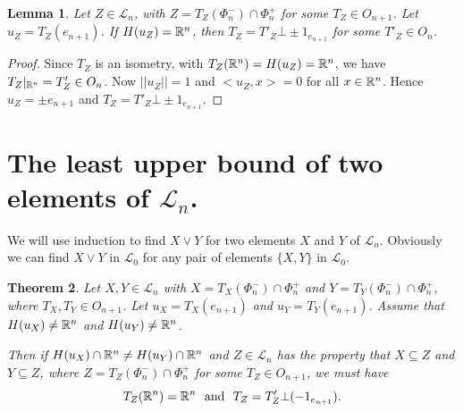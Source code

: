 \documentclass[psamsfonts]{amsart}
\numberwithin{equation}{subsection}
\theoremstyle{plain}
\newtheorem{theorem}{Theorem}[section]
\newtheorem{lemma}[theorem]{Lemma}
\theoremstyle{definition}
\theoremstyle{remark}
\begin{document}
  
 
\begin{lemma}\label{Z}
Let $Z \in \mathcal{L}_n$, with $Z = T_Z(\Phi_n^-)\cap \Phi_n^+$ for some $T_Z \in O_{n + 1}$. 
Let $u_Z = T_Z(e_{n + 1})$.
If $H(u_Z) = \Bbb{R}^n$,   then 
$T_Z = T'_Z \bot \pm 1_{e_{n + 1}}$ for some $T'_Z \in O_n$. 


\end{lemma}
\begin{proof}
 Since $T_Z$ is an isometry, with $T_Z(\Bbb{R}^n) = H(u_Z) =  \Bbb{R}^n$,  we have 
 $T_Z|_{\Bbb{R}^n} = T'_Z \in O_n$. Now $||u_Z|| = 1$ and $<u_Z, x> = 0$ for all $x \in  \Bbb{R}^n$.  Hence $u_Z = \pm e_{n + 1}$ and 
$T_Z = T'_Z\bot \pm 1_{e_{n + 1}}$. 
\end{proof}




\section{The least upper  bound of two elements of $\mathcal{L}_n$. }

We will use induction to find $X \vee Y$  for two elements $X$ and $Y$ of $\mathcal{L}_n$. Obviously we can find 
$X\vee Y$ in $\mathcal{L}_0$ for any pair of elements $\{X, Y\}$ in $\mathcal{L}_0$. 


\begin{theorem}  \label{conditions}
Let $X, Y \in \mathcal{L}_n$ with $X = T_X(\Phi_n^-) \cap \Phi_n^+$ and $Y = T_Y(\Phi_n^-) \cap \Phi_n^+$, where $T_X, T_Y \in O_{n + 1}$. 
Let $u_X = T_X(e_{n + 1})$ and $u_Y = T_Y(e_{n + 1})$. 
Assume that
$H(u_X) \not= \Bbb{R}^{n}$ and $H(u_Y) \not= \Bbb{R}^{n}$. 

Then if $H(u_X) \cap \Bbb{R}^{n} \not= H(u_Y) \cap \Bbb{R}^{n}$
and  $Z \in \mathcal{L}_n$ has the property that $X\subseteq Z$ and $Y\subseteq Z$, where 
$Z = T_Z(\Phi_n^-)\cap \Phi_n^+$ for some $T_Z \in O_{n + 1}$,  we must have 
$$T_Z(\Bbb{R}^{n}) = \Bbb{R}^{n} \ \ \mbox{and} \ \ T_Z = T_Z' \bot (-1_{e_{n + 1}}).$$



\end{theorem}
\end{document}
